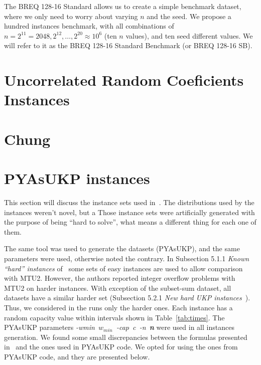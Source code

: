 The BREQ 128-16 Standard allows us to create a simple benchmark dataset, where we only need to worry about varying \(n\) and the seed. We propose a hundred instances benchmark, with all combinations of \(n = 2^{11} = 2048, 2^{12}, \dots, 2^{20} \approx 10^6\) (ten \(n\) values), and ten seed different values. We will refer to it as the BREQ 128-16 Standard Benchmark (or BREQ 128-16 SB).

\section{Uncorrelated Random Coeficients Instances}

\section{Chung}

\section{PYAsUKP instances}

This section will discuss the instance sets used in~\cite{pya}.
The distributions used by the instances weren't novel, but a 
Those instance sets were artificially generated with the purpose of being ``hard to solve'', what means a different thing for each one of them.


The same tool was used to generate the datasets (PYAsUKP), and the same parameters were used, otherwise noted the contrary. 
In Subsection 5.1.1 \emph{Known ``hard'' instances} of~\cite{pya} some sets of easy instances are used to allow comparison with MTU2. 
However, the authors reported integer overflow problems with MTU2 on harder instances. 
With exception of the subset-sum dataset, all datasets have a similar harder set (Subsection 5.2.1 \emph{New hard UKP instances}~\cite{pya}).
Thus, we considered in the runs only the harder ones. 
Each instance has a random capacity value within intervals shown in Table~\ref{tab:times}. 
The PYAsUKP parameters \mbox{\emph{-wmin \(w_{min}\) -cap c -n \textbf{n}}} were used in all instances generation. 
We found some small discrepancies between the formulas presented in~\cite{pya} and the ones used in PYAsUKP code.
We opted for using the ones from  PYAsUKP code, and they are presented below.

